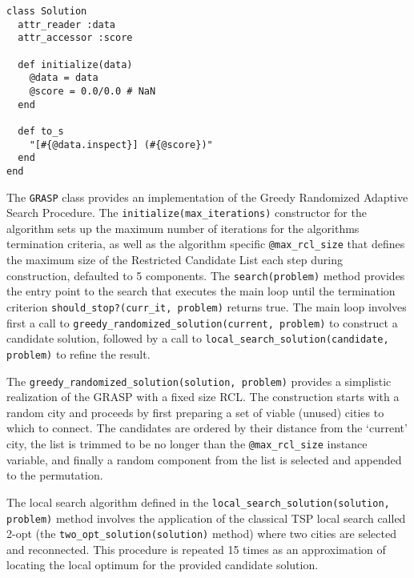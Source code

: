 \begin{lstlisting}
class Solution
  attr_reader :data
  attr_accessor :score
  
  def initialize(data)
    @data = data
    @score = 0.0/0.0 # NaN
  end
  
  def to_s
    "[#{@data.inspect}] (#{@score})"
  end    
end
\end{lstlisting}

The \texttt{GRASP} class provides an implementation of the Greedy Randomized Adaptive Search Procedure. The \texttt{initialize(max\_iterations)} constructor for the algorithm sets up the maximum number of iterations for the algorithms termination criteria, as well as the algorithm specific \texttt{@max\_rcl\_size} that defines the maximum size of the Restricted Candidate List each step during construction, defaulted to 5 components. The \texttt{search(problem)} method provides the entry point to the search that executes the main loop until the termination criterion \texttt{should\_stop?(curr\_it, problem)} returns true. The main loop involves first a call to \texttt{greedy\_randomized\_solution(current, problem)} to construct a candidate solution, followed by a call to \texttt{local\_search\_solution(candidate, problem)} to refine the result.

The \texttt{greedy\_randomized\_solution(solution, problem)} provides a simplistic realization of the GRASP with a fixed size RCL. The construction starts with a random city and proceeds by first preparing a set of viable (unused) cities to which to connect. The candidates are ordered by their distance from the `current' city, the list is trimmed to be no longer than the \texttt{@max\_rcl\_size} instance variable, and finally a random component from the list is selected and appended to the permutation.

The local search algorithm defined in the \texttt{local\_search\_solution(solution, problem)} method involves the application of the classical TSP local search called 2-opt (the \texttt{two\_opt\_solution(solution)} method) where two cities are selected and reconnected. This procedure is repeated 15 times as an approximation of locating the local optimum for the provided candidate solution.

